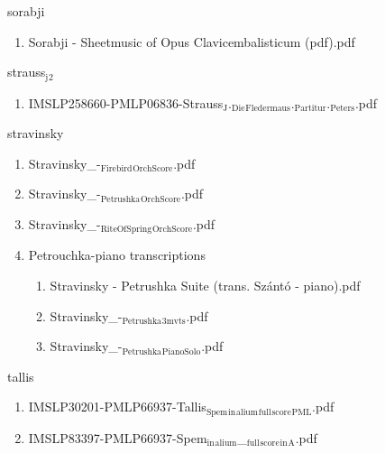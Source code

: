 \documentclass[11pt]{article}
\begin{document}
\item sorabji
\label{sec-1-1-1-1-44-64}
\begin{enumerate}
\item Sorabji - Sheetmusic of Opus Clavicembalisticum (pdf).pdf
\label{sec-1-1-1-1-44-64-1}
\end{enumerate}

\item strauss$_{\text{j}}$$_{\text{2}}$
\label{sec-1-1-1-1-44-65}
\begin{enumerate}
\item IMSLP258660-PMLP06836-Strauss$_{\text{J}}$.$_{\text{Die}}$$_{\text{Fledermaus}}$.$_{\text{Partitur}}$.$_{\text{Peters}}$.pdf
\label{sec-1-1-1-1-44-65-1}
\end{enumerate}

\item stravinsky
\label{sec-1-1-1-1-44-66}
\begin{enumerate}
\item Stravinsky\_-$_{\text{Firebird}}$$_{\text{OrchScore}}$.pdf
\label{sec-1-1-1-1-44-66-1}

\item Stravinsky\_-$_{\text{Petrushka}}$$_{\text{OrchScore}}$.pdf
\label{sec-1-1-1-1-44-66-2}

\item Stravinsky\_-$_{\text{RiteOfSpring}}$$_{\text{OrchScore}}$.pdf
\label{sec-1-1-1-1-44-66-3}

\item Petrouchka-piano transcriptions
\label{sec-1-1-1-1-44-66-4}
\begin{enumerate}
\item Stravinsky - Petrushka Suite (trans. Szántó - piano).pdf
\label{sec-1-1-1-1-44-66-4-1}

\item Stravinsky\_-$_{\text{Petrushka}}$$_{\text{3mvts}}$.pdf
\label{sec-1-1-1-1-44-66-4-2}

\item Stravinsky\_-$_{\text{Petrushka}}$$_{\text{PianoSolo}}$.pdf
\label{sec-1-1-1-1-44-66-4-3}
\end{enumerate}
\end{enumerate}

\item tallis
\label{sec-1-1-1-1-44-67}
\begin{enumerate}
\item IMSLP30201-PMLP66937-Tallis$_{\text{Spem}}$$_{\text{in}}$$_{\text{alium}}$$_{\text{full}}$$_{\text{score}}$$_{\text{PML}}$.pdf
\label{sec-1-1-1-1-44-67-1}

\item IMSLP83397-PMLP66937-Spem$_{\text{in}}$$_{\text{alium}}$\_$_{\text{full}}$$_{\text{score}}$$_{\text{in}}$$_{\text{A}}$.pdf
\label{sec-1-1-1-1-44-67-2}
\end{enumerate}
\end{document}
